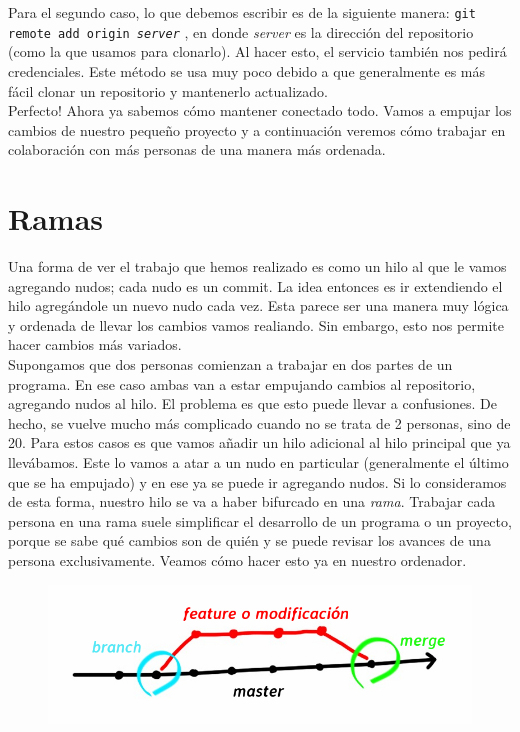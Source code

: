 \documentclass[10pt,letterpaper]{article}
\newcommand{\inlinecode}[1]{
\colorbox{light-gray}{\texttt{#1}}
}
\begin{document}
Para el segundo caso, lo que debemos escribir es de la siguiente manera: \inlinecode{git remote add origin \emph{server}}, en donde \emph{server} es la direcci\'on del repositorio (como la que usamos para clonarlo). Al hacer esto, el servicio tambi\'en nos pedir\'a credenciales. Este m\'etodo se usa muy poco debido a que generalmente es m\'as f\'acil clonar un repositorio y mantenerlo actualizado.\\

Perfecto! Ahora ya sabemos c\'omo mantener conectado todo. Vamos a empujar los cambios de nuestro peque\~no proyecto y a continuaci\'on veremos c\'omo trabajar en colaboraci\'on con m\'as personas de una manera m\'as ordenada.

\section{Ramas}
Una forma de ver el trabajo que hemos realizado es como un hilo al que le vamos agregando nudos; cada nudo es un commit. La idea entonces es ir extendiendo el hilo agreg\'andole un nuevo nudo cada vez. Esta parece ser una manera muy l\'ogica y ordenada de llevar los cambios vamos realiando. Sin embargo, esto nos permite hacer cambios m\'as variados.\\

Supongamos que dos personas comienzan a trabajar en dos partes de un programa. En ese caso ambas van a estar empujando cambios al repositorio, agregando nudos al hilo. El problema es que esto puede llevar a confusiones. De hecho, se vuelve mucho m\'as complicado cuando no se trata de 2 personas, sino de 20. Para estos casos es que vamos a\~nadir un hilo adicional al hilo principal que ya llev\'abamos. Este lo vamos a atar a un nudo en particular (generalmente el \'ultimo que se ha empujado) y en ese ya se puede ir agregando nudos. Si lo consideramos de esta forma, nuestro hilo se va a haber bifurcado en una \emph{rama}. Trabajar cada persona en una rama suele simplificar el desarrollo de un programa o un proyecto, porque se sabe qu\'e cambios son de qui\'en y se puede revisar los avances de una persona exclusivamente. Veamos c\'omo hacer esto ya en nuestro ordenador.\\

\begin{figure}[H]
\begin{center}
\includegraphics[scale=0.4]{img/branching.jpg} 
\end{center}
\end{figure}
\end{document}
